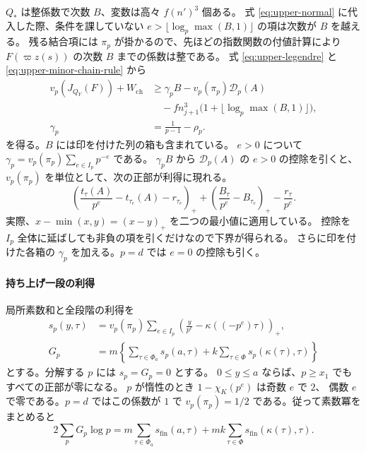 \(Q_*\) は整係数で次数 \(B\)、変数は高々 \(f(n')^3\) 個ある。
式 \eqref{eq:upper-normal} に代入した際、条件を課していない
\(e>\lfloor\log_p\max(B,1)\rfloor\) の項は次数が \(B\) を越える。
残る結合項には \(\pi_p\) が掛かるので、先ほどの指数関数の付値計算により
\(F(\varpi z(s))\) の次数 \(B\) までの係数は整である。
式 \eqref{eq:upper-legendre} と \eqref{eq:upper-minor-chain-rule} から
\begin{equation}\label{eq:upper-jet}
 \begin{aligned}
 v_p(J_{Q_Y}(F))+W_\mathrm{ch}
   &\ge \gamma_p B-v_p(\pi_p)\mathcal D_p(A)\\
   &\quad{}-f n_{j+1}^3\bigl(1+\lfloor\log_p\max(B,1)\rfloor\bigr),\\
 \gamma_p&=\frac1{p-1}-\rho_p .
 \end{aligned}
\end{equation}
を得る。\(B\) には印を付けた列の箱も含まれている。
\(e>0\) について
\(\gamma_p=v_p(\pi_p)\sum_{e\in I_p}p^{-e}\) である。
\(\gamma_p B\) から \(\mathcal D_p(A)\) の \(e>0\) の控除を引くと、
\(v_p(\pi_p)\) を単位として、次の正部が利得に現れる。
\[
 \left(\frac{t_\tau(A)}{p^e}-t_{\tau_e}(A)-r_{\tau_e}\right)_+
 +\left(\frac{B_\tau}{p^e}-B_{\tau_e}\right)_+
 -\frac{r_\tau}{p^e}.
\]
実際、\(x-\min(x,y)=(x-y)_+\) を二つの最小値に適用している。
控除を \(I_p\) 全体に延ばしても非負の項を引くだけなので下界が得られる。
さらに印を付けた各箱の \(\gamma_p\) を加える。\(p=d\) では \(e=0\) の控除も引く。

\paragraph{持ち上げ一段の利得}
局所素数和と全段階の利得を
\begin{align}
 s_p(y,\tau)
  &=v_p(\pi_p)\sum_{e\in I_p}
       \left(\frac{y}{p^e}-\kappa((-p^e)\tau)\right)_+,
       \label{eq:upper-sp}\\
 G_p
  &=m\left\{\sum_{\tau\in\Phi_a}s_p(a,\tau)
           +k\sum_{\tau\in\Phi}s_p(\kappa(\tau),\tau)\right\}
       \label{eq:upper-gain}
\end{align}
とする。分解する \(p\) には \(s_p=G_p=0\) とする。
\(0\le y\le a\) ならば、\(p\ge x_1\) でもすべての正部が零になる。
\(p\) が惰性のとき \(1-\chi_K(p^e)\) は奇数 \(e\) で \(2\)、
偶数 \(e\) で零である。\(p=d\) ではこの係数が \(1\) で
\(v_p(\pi_p)=1/2\) である。従って素数冪をまとめると
\begin{equation}\label{eq:upper-gain-sum}
  2\sum_p G_p\log p =
    m\sum_{\tau\in\Phi_a}s_{\mathrm{fin}}(a,\tau)
       +mk\sum_{\tau\in\Phi}s_{\mathrm{fin}}(\kappa(\tau),\tau).
\end{equation}

